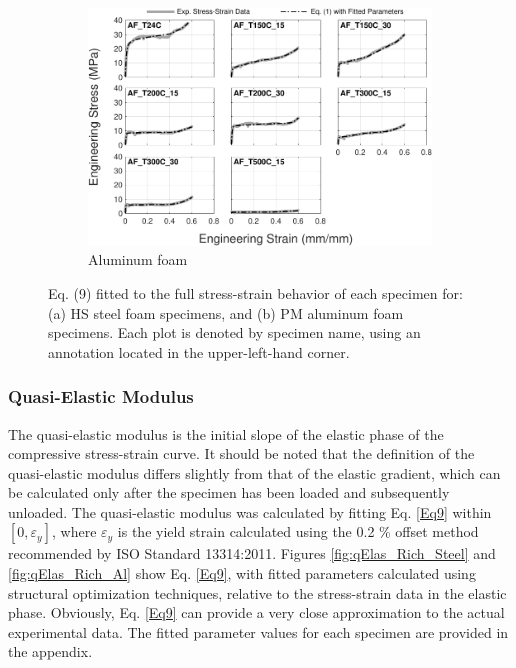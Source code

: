 \documentclass[review]{elsarticle}
\begin{document}
{\begin{figure}
	\par\bigskip %

	\begin{subfigure}{1.00\textwidth}
		\centering
		\includegraphics[width=0.70\linewidth]
		{Tex-Figures/Fig15b-StressStrain-fit-Al.pdf}
		\caption{Aluminum foam}
		\label{fig:StressStrain_Rich_Al}
	\end{subfigure}
	\caption{ Eq. (9) fitted to the full stress-strain behavior of each specimen for: (a) HS steel foam specimens, and (b) PM aluminum foam specimens. Each plot is denoted by specimen name, using an annotation located in the upper-left-hand corner.}
	\label{fig:Stress_strain_fit}
\end{figure}


\subsubsection{Quasi-Elastic Modulus}

The quasi-elastic modulus is the initial slope of the elastic phase of the compressive stress-strain curve. It should be noted that the definition of the quasi-elastic modulus differs slightly from that of the elastic gradient, which can be calculated only after the specimen has been loaded and subsequently unloaded. The quasi-elastic modulus was calculated by fitting Eq. \ref{Eq9} within $[0, \varepsilon_y]$, where $\varepsilon_y$ is the yield strain calculated using the 0.2 \% offset method recommended by ISO Standard 13314:2011. Figures \ref{fig:qElas_Rich_Steel} and \ref{fig:qElas_Rich_Al} show Eq. \ref{Eq9}, with fitted parameters calculated using structural optimization techniques, relative to the stress-strain data in the elastic phase. Obviously, Eq. \ref{Eq9} can provide a very close approximation to the actual experimental data. The fitted parameter values for each specimen are provided in the appendix.


}
\end{document}
